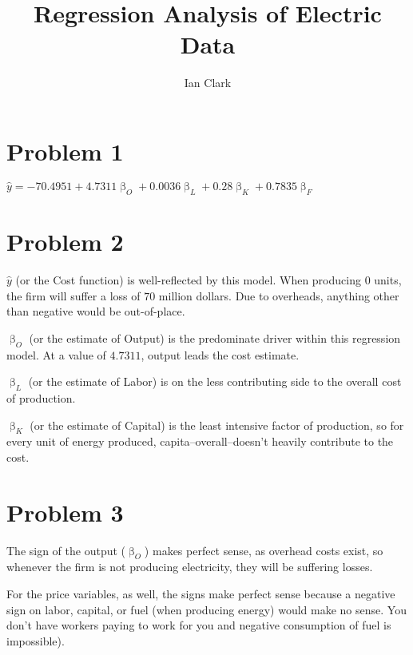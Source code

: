 \documentclass[11pt,letterpaper,english]{article}
\title{Regression Analysis of Electric Data}
\author{Ian Clark}
\date{}
\begin{document}
\maketitle

\section{Problem 1}
\begin{center}
$\hat{y} = -70.4951 + 4.7311\upbeta_O + 0.0036\upbeta_L + 0.28\upbeta_K + 0.7835\upbeta_F$
\end{center}

\section{Problem 2}
$\hat{y}$ (or the Cost function) is well-reflected by this model. When producing $0$ units, the firm will suffer a loss of $70$ million dollars. Due to overheads, anything other than negative would be out-of-place. 

\vspace{5mm}
\noindent
$\upbeta_O$ (or the estimate of Output) is the predominate driver within this regression model. At a value of $4.7311$, output leads the cost estimate.

\vspace{5mm}
\noindent
$\upbeta_L$ (or the estimate of Labor) is on the less contributing side to the overall cost of production. 

\vspace{5mm}
\noindent
$\upbeta_K$ (or the estimate of Capital) is the least intensive factor of production, so for every unit of energy produced, capita--overall--doesn't heavily contribute to the cost.

\section{Problem 3}

The sign of the output ($\upbeta_O$) makes perfect sense, as overhead costs exist, so whenever the firm is not producing electricity, they will be suffering losses.

\vspace{5mm}
\noindent
For the price variables, as well, the signs make perfect sense because a negative sign on labor, capital, or fuel (when producing energy) would make no sense. You don't have workers paying to work for you and negative consumption of fuel is impossible).
\end{document}
